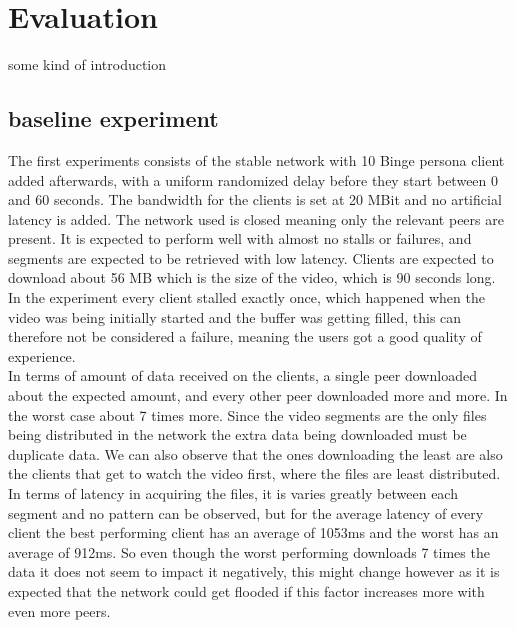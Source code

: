 \chapter{Evaluation}
\label{cha:evaluation}
some kind of introduction


\section{baseline experiment}    
The first experiments consists of the stable network with 10 Binge persona client added afterwards, with a uniform randomized delay before they start between 0 and 60 seconds. The bandwidth for the clients is set at 20 \acs{MBit} and no artificial latency is added. The network used is closed meaning only the relevant peers are present. It is expected to perform well with almost no stalls or failures, and segments are expected to be retrieved with low latency. Clients are expected to download about 56 \acs{MB} which is the size of the video, which is 90 seconds long. \\
In the experiment every client stalled exactly once, which happened when the video was being initially started and the buffer was getting filled, this can therefore not be considered a failure, meaning the users got a good quality of experience.\\ 
In terms of amount of data received on the clients, a single peer downloaded about the expected amount, and every other peer downloaded more and more. In the worst case about 7 times more. 
Since the video segments are the only files being distributed in the network the extra data being downloaded must be duplicate data. We can also observe that the ones downloading the least are also the clients that get to watch the video first, where the files are least distributed.\\ %
In terms of latency in acquiring the files, it is varies greatly between each segment and no pattern can be observed, but for the average latency of every client the best performing client has an average of 1053\acs{ms} and the worst has an average of 912\acs{ms}. %
So even though the worst performing downloads 7 times the data it does not seem to impact it negatively, this might change however as it is expected that the network could get flooded if this factor increases more with even more peers.

